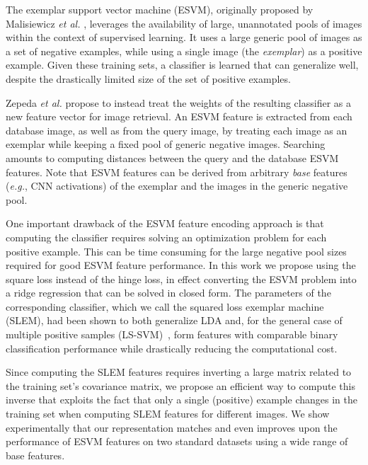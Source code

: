 The exemplar support vector machine (ESVM), originally proposed by Malisiewicz {\it et al.} \cite{Malisiewicza}, leverages the availability of large, unannotated pools of images within the context of supervised learning. It uses a large generic pool of images as a set of negative examples, while using a single image (the \emph{exemplar}) as a positive example. Given these training sets, a classifier is learned that can  generalize well, despite the drastically limited size of the set of positive examples.

Zepeda \emph{et al.} \cite{ZePe15} propose to instead treat the weights of the resulting classifier as a new feature vector for image retrieval. %
An ESVM feature is extracted from each database image, as well as from the query image, by treating each image as an exemplar while keeping a fixed pool of generic negative images. Searching amounts to computing distances between the query and the database ESVM features. Note that ESVM features can be derived from arbitrary \emph{base} features ({\it e.g.}, CNN activations) of the exemplar and the images in the generic negative pool. %


One important drawback of the ESVM feature encoding approach is that computing the  classifier requires solving an optimization problem for each positive example. This can be time consuming for the large negative pool sizes required for good ESVM feature performance. In this work we propose using the square loss instead of the hinge loss, in effect converting the ESVM problem into a ridge regression that can be solved in closed form. The parameters of the corresponding classifier, which we call the squared loss exemplar machine (SLEM), had been shown to both generalize LDA \cite{Koba15} and, for the general case of multiple positive samples (LS-SVM)~\cite{lssvm}, form features with comparable binary classification performance while drastically reducing the computational cost.


Since computing the SLEM features requires inverting a large matrix related to the training set's covariance matrix, we propose an efficient way to compute this inverse that exploits the fact that only a single (positive) example changes in the training set when computing SLEM features for different images. We show experimentally that our representation matches and even improves upon the performance of ESVM features on two standard datasets using a wide range of base features.

